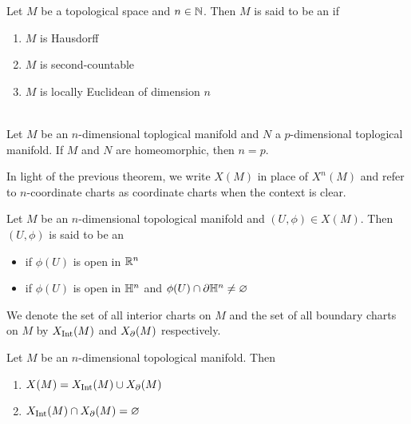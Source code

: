 \documentclass{book}
\begin{document}
	\begin{defn}
		Let $M$ be a topological space and $n \in \mathbb{N}$. Then $M$ is said to be an  if 
		\begin{enumerate}
			\item $M$ is Hausdorff
			\item $M$ is second-countable
			\item $M$ is locally Euclidean of dimension $n$
		\end{enumerate}
	\end{defn}

	\begin{thm}  \\
		Let $M$ be an $n$-dimensional toplogical manifold and $N$ a $p$-dimensional toplogical manifold. If $M$ and $N$ are homeomorphic, then $n = p$.
	\end{thm}

	\begin{note}
		In light of the previous theorem, we write $X(M)$ in place of $X^n(M)$ and refer to $n$-coordinate charts as coordinate charts when the context is clear.
	\end{note}

	\begin{defn}
		Let $M$ be an $n$-dimensional topological manifold and $(U, \phi) \in X(M)$. Then $(U, \phi)$ is said to be an
		\begin{itemize}
			\item {} if $\phi(U)$ is open in $\mathbb{R}^n$ 
			\item {} if $\phi(U)$ is open in $\mathbb{H}^n$ and $\phi(U) \cap \partial \mathbb{H}^n \neq \varnothing$
		\end{itemize}
		We denote the set of all interior charts on $M$ and the set of all boundary charts on $M$ by $X_{\operatorname{Int}}(M)$ and $X_{\partial}(M)$ respectively. 
	\end{defn}

	\begin{ex}
		Let $M$ be an $n$-dimensional topological manifold. Then 
		\begin{enumerate}
			\item $X(M) = X_{\operatorname{Int}}(M) \cup X_{\partial}(M)$
			\item $X_{\operatorname{Int}}(M) \cap X_{\partial}(M) = \varnothing$
		\end{enumerate}
	\end{ex}
\end{document}
